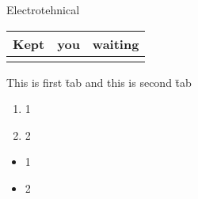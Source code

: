 \documentclass[a4paper, 12pt]{article}
\begin{document}
\noindent Electro\-tehnical

\begin{tabular}{c|r|l}
    Kept & you & waiting \\ \hline
    \label{tab1}
\end{tabular}

\begin{tabbing}
    This is first \=tab and this is second \=tab \\
 
\end{tabbing}

\begin{enumerate}
    \item 1
    \item 2
\end{enumerate}

\begin{itemize}
    \item 1
    \item 2
\end{itemize}
\end{document}
